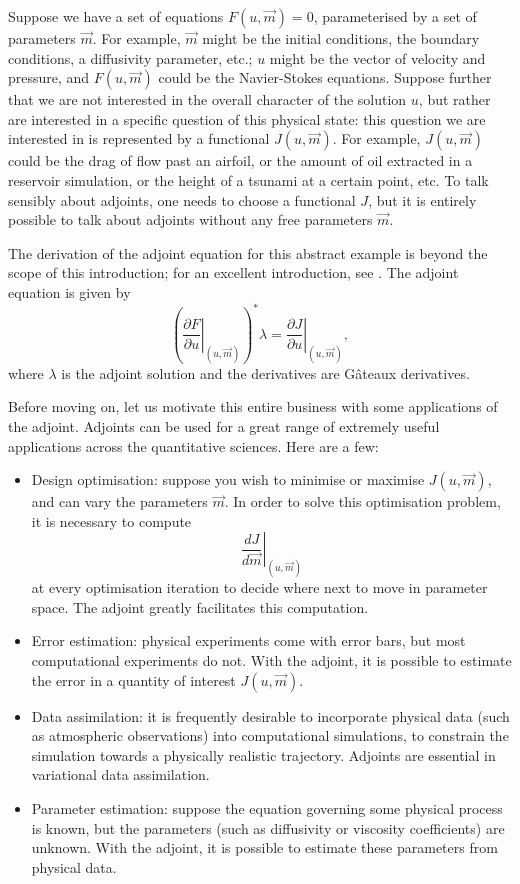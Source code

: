 \documentclass[10pt,authoryear]{elsarticle}
\newcommand{\m}[0]{{\vec{m}}}
\begin{document}
Suppose we have a set of equations $F(u, \m) = 0$, parameterised by a set of parameters $\m$. For example,
$\m$ might be the initial conditions, the boundary conditions, a diffusivity parameter, etc.; $u$ might be the
vector of velocity and pressure, and $F(u, \m)$ could be the Navier-Stokes equations. Suppose further that
we are not interested in the overall character of the solution $u$, but rather are interested in a specific
question of this physical state: this question we are interested in is represented by a functional $J(u, \m)$.
For example, $J(u, \m)$ could be the drag of flow past an airfoil, or the amount of oil extracted in a reservoir simulation,
or the height of a tsunami at a certain point, etc. To talk sensibly about adjoints, one needs to choose a functional
$J$, but it is entirely possible to talk about adjoints without any free parameters $\m$.

The derivation of the adjoint equation for this abstract example is beyond the scope of this introduction;
for an excellent introduction, see \citet{gunzburger2003}. The adjoint equation is given by
\begin{equation} \label{eqn:abstract_adjoint}
\left(\left.\frac{\partial F}{\partial u}\right|_{(u,\m)}\right)^{*} \lambda = \left.\frac{\partial J}{\partial u}\right|_{(u,\m)},
\end{equation}
where $\lambda$ is the adjoint solution and the derivatives are G\^ateaux derivatives.

Before moving on, let us motivate this entire business with some applications of the adjoint. Adjoints can be used for a great
range of extremely useful applications across the quantitative sciences. Here are a few:
\begin{itemize}
\item Design optimisation: suppose you wish to minimise or maximise $J(u,\m)$, and can vary the parameters $\m$.
In order to solve this optimisation problem, it is necessary to compute
\begin{equation}
\left.\frac{dJ}{d\m}\right|_{(u, \m)}
\end{equation}
at every optimisation iteration to decide where next to move in parameter space. The adjoint greatly facilitates this
computation.
\item Error estimation: physical experiments come with error bars, but most computational experiments do not. With the
adjoint, it is possible to estimate the error in a quantity of interest $J(u,\m)$.
\item Data assimilation: it is frequently desirable to incorporate physical data (such as atmospheric observations)
into computational simulations, to constrain the simulation towards a physically realistic trajectory. Adjoints are
essential in variational data assimilation.
\item Parameter estimation: suppose the equation governing some physical process is known, but the parameters
(such as diffusivity or viscosity coefficients) are unknown. With the adjoint, it is possible to estimate these parameters
from physical data.
\end{itemize}
\end{document}
